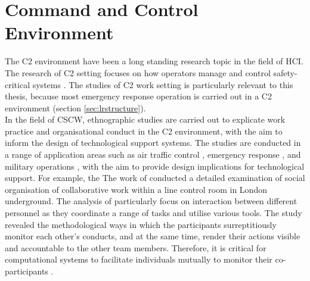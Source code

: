 

\section{Command and Control Environment}\label{sec:LRC2}
The \acf{C2} environment have been a long standing research topic in the field of \acf{HCI}. The  research of \ac{C2} setting focuses on how operators manage and control safety-critical systems \cite{Fischer2015}. The studies of \ac{C2} work setting is particularly relevant to this thesis, because most emergency response operation is carried out in a \ac{C2} environment (section \ref{sec:lrstructure}). \\

In the field of CSCW, ethnographic studies are carried out to explicate work practice and organisational conduct in the \ac{C2} environment, with the aim to inform the design of technological support systems. The studies are conducted in a range of application areas such as air traffic control \cite{RichardH.R.HarperJohnA.Hughes1989}, emergency response \cite{Fischer2015} , and military operations \cite{Tolcher2005}, with the aim to provide design implications for technological support. For example, the The work of \cite{Heath1992} conducted a detailed examination of social organisation of collaborative work within a line control room in London underground. The analysis of \cite{Heath1992} particularly focus on interaction between different personnel as they coordinate a range of tasks and utilise various tools. The study revealed the methodological ways in which the participants surreptitiously monitor each other's conducts, and at the same time, render their actions visible and accountable to the other team members. Therefore, it is critical for computational systems to facilitate individuals mutually to monitor their co-participants \cite{Heath1992}.\\

